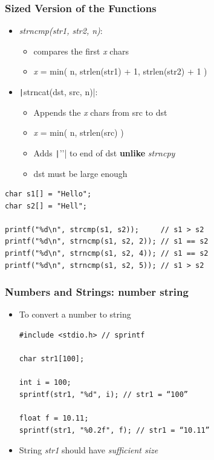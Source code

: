 \documentclass{../c-lecture}
\begin{document}
\begin{frame}
  \frametitle{Sized Version of the Functions}
  \begin{itemize}
    \item \textit{\color{YellowOrange}strncmp(str1, str2, n)}:
    \begin{itemize}
      \item compares the first \textit{\color{LimeGreen}x} chars
      \item
        \textit{\color{LimeGreen} x} = min( n, strlen(str1) + 1,
        strlen(str2) + 1 )

    \end{itemize}
    \item \texttt|strncat(dst, src, n)|:
    \begin{itemize}
      \item
        Appends the \textit{\color{LimeGreen} x} chars from src to dst

      \item \textit{\color{LimeGreen} x} = min( n, strlen(src) )
      \item
        Adds \texttt|'\0'| to end of dst \textbf{\color{RubineRed} unlike}
        \textit{\color{Cyan} strncpy}

      \item dst must be large enough
    \end{itemize}
  \end{itemize}
\end{frame}

\begin{frame}[fragile]
  \begin{verbatim}
char s1[] = "Hello";
char s2[] = "Hell";

printf("%d\n", strcmp(s1, s2));     // s1 > s2
printf("%d\n", strncmp(s1, s2, 2)); // s1 == s2
printf("%d\n", strncmp(s1, s2, 4)); // s1 == s2
printf("%d\n", strncmp(s1, s2, 5)); // s1 > s2
  \end{verbatim}
\end{frame}

\begin{frame}[fragile]
  \frametitle{Numbers and Strings: number \textrightarrow string}
  \begin{itemize}
    \item To convert a number to string
    \begin{verbatim}
#include <stdio.h> // sprintf

char str1[100];

int i = 100;
sprintf(str1, "%d", i); // str1 = “100”

float f = 10.11;
sprintf(str1, "%0.2f", f); // str1 = “10.11”

    \end{verbatim}
    \item
      String \textit{\color{YellowOrange} str1} should have
      \textit{\color{CarnationPink} sufficient size}

  \end{itemize}
\end{frame}
\end{document}
